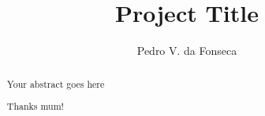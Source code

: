 \documentclass[a4paper, twoside]{report}
\title{Project Title}
\author{Pedro V. da Fonseca}
\begin{document}


\begin{abstract}
Your abstract goes here
\end{abstract}

\renewcommand{\abstractname}{Acknowledgements}
\begin{abstract}
Thanks mum!
\end{abstract}

\tableofcontents
\listoffigures
\listoftables

%
%
%
%
%
%



\end{document}
